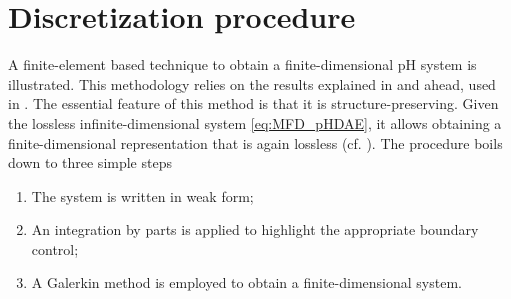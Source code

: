 \documentclass{svjour3}                     %
\newcommand{\secondRev}[1]{\textcolor{blue!80!black}{#1}}
\begin{document}
	\section{Discretization procedure}
	\label{sec:discr}
	A finite-element based technique to obtain a finite-dimensional pH system is illustrated. This methodology relies on the results explained in \cite{cardoso2019partitioned} and ahead, used in \cite{BRUGNOLI2019940,BRUGNOLI2019961}. The essential feature of this method is that it is structure-preserving. Given the lossless infinite-dimensional system \eqref{eq:MFD_pHDAE}, it allows obtaining a finite-dimensional representation that is again lossless \secondRev{(cf. \cite[Definition 3.1.4]{vandershaft2000l2})}. The procedure boils down to three simple steps
	\begin{enumerate}
		\item The system is written in weak form; 
		\item An integration by parts is applied to highlight the appropriate boundary control;
		\item A Galerkin method is employed to obtain a finite-dimensional system.
	\end{enumerate}
	
\end{document}
